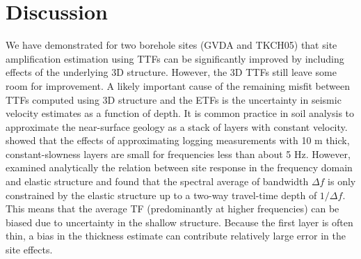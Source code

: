 {\section{Discussion}\label{etf:discussion}
We have demonstrated for two borehole sites (GVDA and TKCH05) that site amplification estimation using TTFs can be significantly improved by including effects of the underlying 3D structure. However, the 3D TTFs still leave some room for improvement. A likely important cause of the remaining misfit between TTFs computed using 3D structure and the ETFs is the uncertainty in seismic velocity estimates as a function of depth. It is common practice in soil analysis to approximate the near-surface geology as a stack of layers with constant velocity. \citet{booreUsingSurfacesourceDownholereceiver2007} showed that the effects of approximating logging measurements with 10 m thick, constant-slowness layers are small for frequencies less than about 5 Hz. However, \citet{dayRMSResponseOnedimensional1996} examined analytically the relation between site response in the frequency domain and elastic structure and found that the spectral average of bandwidth ${\Delta{f}}$ is only constrained by the elastic structure up to a two-way travel-time depth of ${1/\Delta{f}}$. This means that the average TF (predominantly at higher frequencies) can be biased due to uncertainty in the shallow structure. Because the first layer is often thin, a bias in the thickness estimate can contribute relatively large error in the site effects.

}
